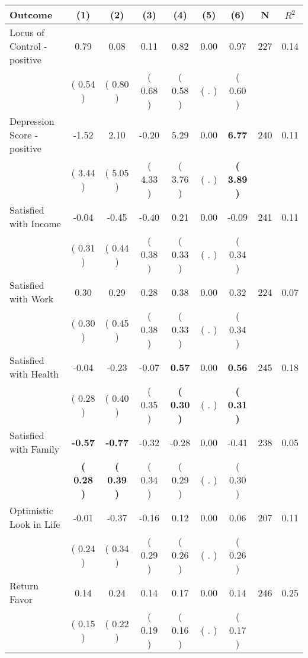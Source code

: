 \begin{tabular}{lcccccccc}
\toprule
 \textbf{Outcome} & \textbf{(1)} & \textbf{(2)} & \textbf{(3)} & \textbf{(4)} & \textbf{(5)} & \textbf{(6)} & \textbf{N} & \textbf{$ R^2$} \\
\midrule
Locus of Control - positive &      0.79 &      0.08 &      0.11 &      0.82 &      0.00 &      0.97 & 227 &       0.14 \\ 
 & (     0.54 ) & (     0.80 ) & (     0.68 ) & (     0.58 ) & (        . ) & (     0.60 ) & \\
Depression Score - positive &     -1.52 &      2.10 &     -0.20 &      5.29 &      0.00 & \textbf{     6.77} & 240 &       0.11 \\ 
 & (     3.44 ) & (     5.05 ) & (     4.33 ) & (     3.76 ) & (        . ) & \textbf{(     3.89 )} & \\
Satisfied with Income &     -0.04 &     -0.45 &     -0.40 &      0.21 &      0.00 &     -0.09 & 241 &       0.11 \\ 
 & (     0.31 ) & (     0.44 ) & (     0.38 ) & (     0.33 ) & (        . ) & (     0.34 ) & \\
Satisfied with Work &      0.30 &      0.29 &      0.28 &      0.38 &      0.00 &      0.32 & 224 &       0.07 \\ 
 & (     0.30 ) & (     0.45 ) & (     0.38 ) & (     0.33 ) & (        . ) & (     0.34 ) & \\
Satisfied with Health &     -0.04 &     -0.23 &     -0.07 & \textbf{     0.57} &      0.00 & \textbf{     0.56} & 245 &       0.18 \\ 
 & (     0.28 ) & (     0.40 ) & (     0.35 ) & \textbf{(     0.30 )} & (        . ) & \textbf{(     0.31 )} & \\
Satisfied with Family & \textbf{    -0.57} & \textbf{    -0.77} &     -0.32 &     -0.28 &      0.00 &     -0.41 & 238 &       0.05 \\ 
 & \textbf{(     0.28 )} & \textbf{(     0.39 )} & (     0.34 ) & (     0.29 ) & (        . ) & (     0.30 ) & \\
Optimistic Look in Life &     -0.01 &     -0.37 &     -0.16 &      0.12 &      0.00 &      0.06 & 207 &       0.11 \\ 
 & (     0.24 ) & (     0.34 ) & (     0.29 ) & (     0.26 ) & (        . ) & (     0.26 ) & \\
Return Favor &      0.14 &      0.24 &      0.14 &      0.17 &      0.00 &      0.14 & 246 &       0.25 \\ 
 & (     0.15 ) & (     0.22 ) & (     0.19 ) & (     0.16 ) & (        . ) & (     0.17 ) & \\

\end{tabular}
